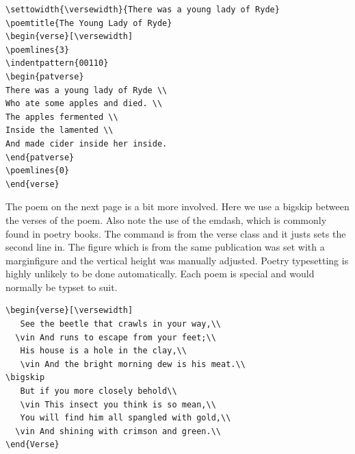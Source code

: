\begin{lstlisting}[language={[common]TeX},% 
                           alsolanguage={[LaTeX]TeX},% 
                           alsolanguage={[primitive]TeX},%
                           alsolanguage={extras}]
\settowidth{\versewidth}{There was a young lady of Ryde}
\poemtitle{The Young Lady of Ryde}
\begin{verse}[\versewidth]
\poemlines{3}
\indentpattern{00110}
\begin{patverse}
There was a young lady of Ryde \\
Who ate some apples and died. \\
The apples fermented \\
Inside the lamented \\
And made cider inside her inside.
\end{patverse}
\poemlines{0}
\end{verse}
\end{lstlisting}


The  poem on the next page is a bit more involved. Here we use a bigskip between the verses of the poem. Also note
the use of the emdash, which is commonly found in poetry books. The command  is from the verse class
and it justs sets the second line in. The figure which is from the same publication was set with a marginfigure and the
vertical height was manually adjusted. Poetry typesetting is highly unlikely to be done automatically. Each poem is
special and would normally be typset to suit.

\begin{lstlisting}[language={[common]TeX},% 
                           alsolanguage={[LaTeX]TeX},% 
                           alsolanguage={[primitive]TeX},%
                           alsolanguage={extras}]
\begin{verse}[\versewidth]
   See the beetle that crawls in your way,\\
  \vin And runs to escape from your feet;\\
   His house is a hole in the clay,\\
   \vin And the bright morning dew is his meat.\\
\bigskip
   But if you more closely behold\\
   \vin This insect you think is so mean,\\
   You will find him all spangled with gold,\\
  \vin And shining with crimson and green.\\
\end{Verse}
\end{lstlisting}

